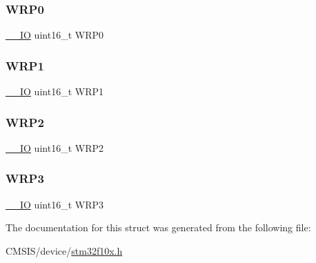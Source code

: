 \mbox{\label{struct_o_b___type_def_ad43c7a196f0eef88b3038383c4f7d903}} 
\subsubsection{\texorpdfstring{WRP0}{WRP0}}
{\footnotesize\ttfamily \mbox{\hyperlink{core__sc300_8h_aec43007d9998a0a0e01faede4133d6be}{\+\_\+\+\_\+\+IO}} uint16\+\_\+t W\+R\+P0}

\mbox{\label{struct_o_b___type_def_ac4e091dcb644dbb5d4a2c7aca7d4fe88}} 
\subsubsection{\texorpdfstring{WRP1}{WRP1}}
{\footnotesize\ttfamily \mbox{\hyperlink{core__sc300_8h_aec43007d9998a0a0e01faede4133d6be}{\+\_\+\+\_\+\+IO}} uint16\+\_\+t W\+R\+P1}

\mbox{\label{struct_o_b___type_def_a05486d021c6761bf5a04f410a1c24e06}} 
\subsubsection{\texorpdfstring{WRP2}{WRP2}}
{\footnotesize\ttfamily \mbox{\hyperlink{core__sc300_8h_aec43007d9998a0a0e01faede4133d6be}{\+\_\+\+\_\+\+IO}} uint16\+\_\+t W\+R\+P2}

\mbox{\label{struct_o_b___type_def_a7d9c1634a4c6027e12345f25d9d15b4d}} 
\subsubsection{\texorpdfstring{WRP3}{WRP3}}
{\footnotesize\ttfamily \mbox{\hyperlink{core__sc300_8h_aec43007d9998a0a0e01faede4133d6be}{\+\_\+\+\_\+\+IO}} uint16\+\_\+t W\+R\+P3}



The documentation for this struct was generated from the following file\+:\begin{DoxyCompactItemize}
\item 
C\+M\+S\+I\+S/device/\mbox{\hyperlink{stm32f10x_8h}{stm32f10x.\+h}}\end{DoxyCompactItemize}

